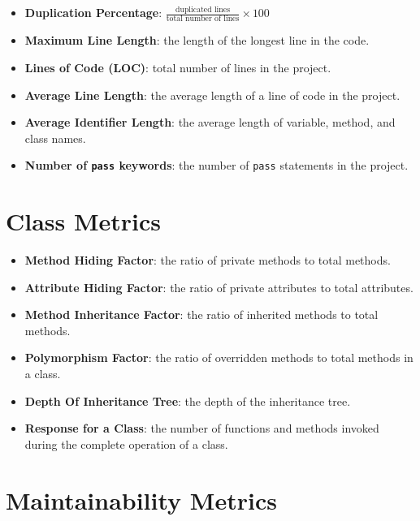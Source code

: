 \documentclass{article}
\begin{document}
\begin{itemize}
    \item \textbf{Duplication Percentage}: \(\frac{\text{duplicated lines}}{\text{total number of lines}} \times 100\)
    \item \textbf{Maximum Line Length}: the length of the longest line in the code.
    \item \textbf{Lines of Code (LOC)}: total number of lines in the project.
    \item \textbf{Average Line Length}: the average length of a line of code in the project.
    \item \textbf{Average Identifier Length}: the average length of variable, method, and class names.
    \item \textbf{Number of \texttt{pass} keywords}: the number of \texttt{pass} statements in the project.
\end{itemize}

\section{Class Metrics}

\begin{itemize}
    \item \textbf{Method Hiding Factor}: the ratio of private methods to total methods.
    \item \textbf{Attribute Hiding Factor}: the ratio of private attributes to total attributes.
    \item \textbf{Method Inheritance Factor}: the ratio of inherited methods to total methods.
    \item \textbf{Polymorphism Factor}: the ratio of overridden methods to total methods in a class.
    \item \textbf{Depth Of Inheritance Tree}: the depth of the inheritance tree.
    \item \textbf{Response for a Class}: the number of functions and methods invoked during the complete operation of a class.
\end{itemize}

\section{Maintainability Metrics}
\end{document}
